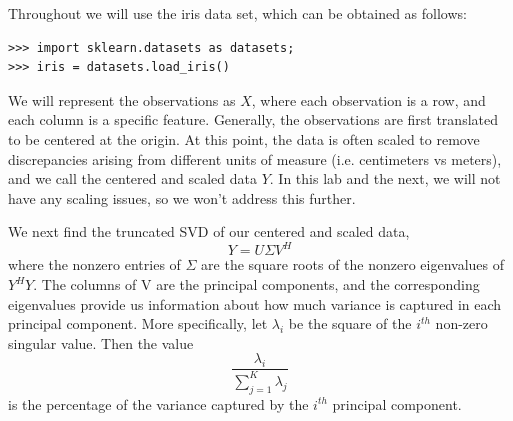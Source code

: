 Throughout we will use the iris data set, which can be obtained as follows:
\begin{lstlisting}
>>> import sklearn.datasets as datasets;
>>> iris = datasets.load_iris()
\end{lstlisting}
We will represent the observations as $X$, where each observation is a row, and each column is a specific feature. Generally, the observations are first translated to be centered at the origin. At this point, the data is often scaled to remove discrepancies arising from different units of measure (i.e. centimeters vs meters), and we call the centered and scaled data $Y$. In this lab and the next, we will not have any scaling issues, so we won't address this further. 

We next find the truncated SVD of our centered and scaled data, 
\[Y = U\Sigma V^{H}\]
where the nonzero entries of $\Sigma$ are the square roots of the nonzero eigenvalues of $Y^{H}Y$. The columns of V are the principal components, and the corresponding eigenvalues provide us information about how much variance is captured in each principal component. More specifically, let $\lambda_{i}$ be the square of the $i^{th}$ non-zero singular value. Then the value 
\[\frac{\lambda_{i}}{\sum_{j=1}^{K} \lambda_{j}}\] 
is the percentage of the variance captured by the $i^{th}$ principal component.

